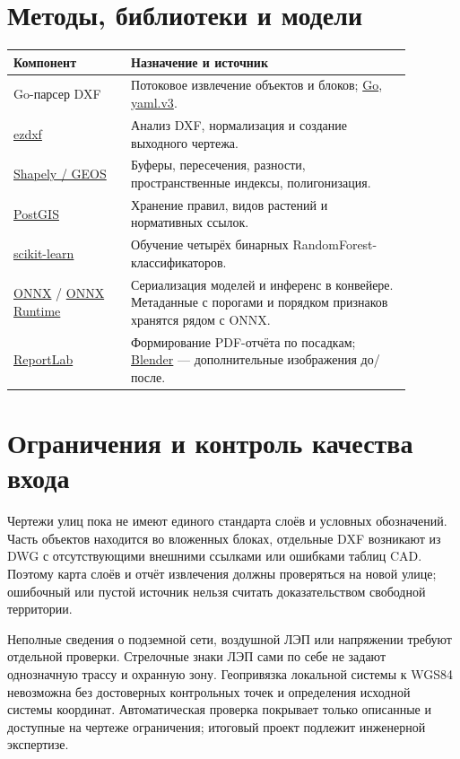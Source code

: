 \documentclass[11pt,a4paper]{article}
\begin{document}
\section{Методы, библиотеки и модели}
\begin{longtable}{p{0.26\linewidth}>{\raggedright\arraybackslash}p{0.62\linewidth}}
\toprule
Компонент & Назначение и источник\\\midrule\endhead
Go-парсер DXF & Потоковое извлечение объектов и блоков; \href{https://go.dev/}{Go}, \href{https://pkg.go.dev/gopkg.in/yaml.v3}{yaml.v3}.\\
\href{https://ezdxf.readthedocs.io/}{ezdxf} & Анализ DXF, нормализация и создание выходного чертежа.\\
\href{https://shapely.readthedocs.io/}{Shapely / GEOS} & Буферы, пересечения, разности, пространственные индексы, полигонизация.\\
\href{https://postgis.net/documentation/}{PostGIS} & Хранение правил, видов растений и нормативных ссылок.\\
\href{https://scikit-learn.org/stable/}{scikit-learn} & Обучение четырёх бинарных RandomForest-классификаторов.\\
\href{https://onnx.ai/}{ONNX} / \href{https://onnxruntime.ai/docs/}{ONNX Runtime} & Сериализация моделей и инференс в конвейере. Метаданные с порогами и порядком признаков хранятся рядом с ONNX.\\
\href{https://www.reportlab.com/docs/reportlab-userguide.pdf}{ReportLab} & Формирование PDF-отчёта по посадкам; \href{https://www.blender.org/}{Blender} --- дополнительные изображения до/после.\\
\bottomrule
\end{longtable}

\section{Ограничения и контроль качества входа}
Чертежи улиц пока не имеют единого стандарта слоёв и условных обозначений. Часть объектов находится во вложенных блоках, отдельные DXF возникают из DWG с отсутствующими внешними ссылками или ошибками таблиц CAD. Поэтому карта слоёв и отчёт извлечения должны проверяться на новой улице; ошибочный или пустой источник нельзя считать доказательством свободной территории.

Неполные сведения о подземной сети, воздушной ЛЭП или напряжении требуют отдельной проверки. Стрелочные знаки ЛЭП сами по себе не задают однозначную трассу и охранную зону. Геопривязка локальной системы к WGS84 невозможна без достоверных контрольных точек и определения исходной системы координат. Автоматическая проверка покрывает только описанные и доступные на чертеже ограничения; итоговый проект подлежит инженерной экспертизе.
\end{document}
